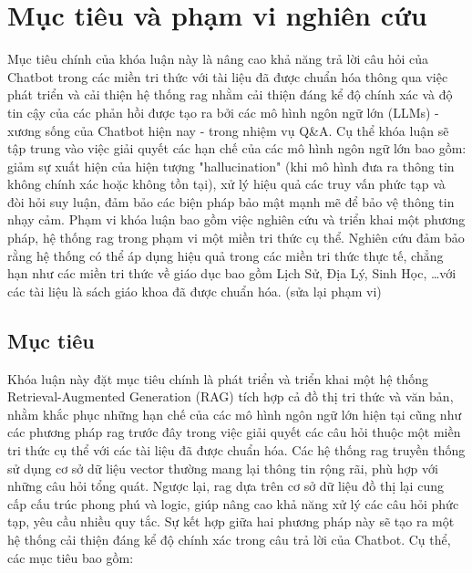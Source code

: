 \section{Mục tiêu và phạm vi nghiên cứu}
\label{section:objective_and_scope}
Mục tiêu chính của khóa luận này là nâng cao khả năng trả lời câu hỏi của Chatbot trong các miền tri thức với tài liệu đã được chuẩn hóa thông qua việc phát triển và cải thiện hệ thống \gls{rag} nhằm cải thiện đáng kể độ chính xác và độ tin cậy của các phản hồi được tạo ra bởi các mô hình ngôn ngữ lớn (LLMs) - xương sống của Chatbot hiện nay - trong nhiệm vụ Q\&A. Cụ thể khóa luận sẽ tập trung vào việc giải quyết các hạn chế của các mô hình ngôn ngữ lớn bao gồm: giảm sự xuất hiện của hiện tượng "hallucination" (khi mô hình đưa ra thông tin không chính xác hoặc không tồn tại), xử lý hiệu quả các truy vấn phức tạp và đòi hỏi suy luận, đảm bảo các biện pháp bảo mật mạnh mẽ để bảo vệ thông tin nhạy cảm. Phạm vi khóa luận bao gồm việc nghiên cứu và triển khai một phương pháp, hệ thống \gls{rag} trong phạm vi một miền tri thức cụ thể. Nghiên cứu đảm bảo rằng hệ thống có thể áp dụng hiệu quả trong các miền tri thức thực tế, chẳng hạn như các miền tri thức về giáo dục bao gồm Lịch Sử, Địa Lý, Sinh Học, \dots với các tài liệu là sách giáo khoa đã được chuẩn hóa. (sửa lại phạm vi)


\subsection{Mục tiêu}
\label{subsection:objective}
Khóa luận này đặt mục tiêu chính là phát triển và triển khai một hệ thống Retrieval-Augmented Generation (RAG) tích hợp cả đồ thị tri thức và văn bản, nhằm khắc phục những hạn chế của các mô hình ngôn ngữ lớn hiện tại cũng như các phương pháp \gls{rag} trước đây trong việc giải quyết các câu hỏi thuộc một miền tri thức cụ thể với các tài liệu đã được chuẩn hóa. Các hệ thống \gls{rag} truyền thống sử dụng cơ sở dữ liệu vector thường mang lại thông tin rộng rãi, phù hợp với những câu hỏi tổng quát. Ngược lại, \gls{rag} dựa trên cơ sở dữ liệu đồ thị lại cung cấp cấu trúc phong phú và logic, giúp nâng cao khả năng xử lý các câu hỏi phức tạp, yêu cầu nhiều quy tắc. Sự kết hợp giữa hai phương pháp này sẽ tạo ra một hệ thống cải thiện đáng kể độ chính xác trong câu trả lời của Chatbot. Cụ thể, các mục tiêu bao gồm:


